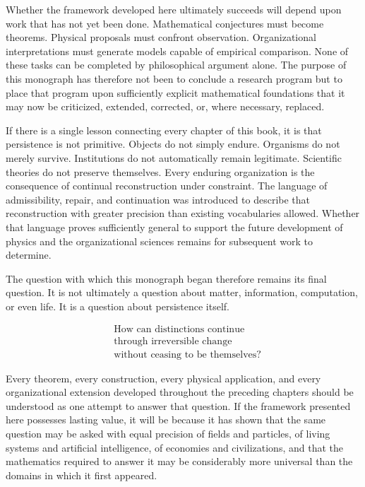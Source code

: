 \documentclass[11pt,oneside]{book}
\numberwithin{equation}{chapter}
\theoremstyle{definition}
\theoremstyle{plain}
\begin{document}
Whether the framework developed here ultimately succeeds will depend upon
work that has not yet been done. Mathematical conjectures must become
theorems. Physical proposals must confront observation. Organizational
interpretations must generate models capable of empirical comparison. None
of these tasks can be completed by philosophical argument alone. The
purpose of this monograph has therefore not been to conclude a research
program but to place that program upon sufficiently explicit mathematical
foundations that it may now be criticized, extended, corrected, or, where
necessary, replaced.

If there is a single lesson connecting every chapter of this book, it is
that persistence is not primitive. Objects do not simply endure. Organisms
do not merely survive. Institutions do not automatically remain
legitimate. Scientific theories do not preserve themselves. Every enduring
organization is the consequence of continual reconstruction under
constraint. The language of admissibility, repair, and continuation was
introduced to describe that reconstruction with greater precision than
existing vocabularies allowed. Whether that language proves sufficiently
general to support the future development of physics and the
organizational sciences remains for subsequent work to determine.

The question with which this monograph began therefore remains its final
question. It is not ultimately a question about matter, information,
computation, or even life. It is a question about persistence itself.

\[
\boxed{
\begin{aligned}
&\text{How can distinctions continue}\\
&\text{through irreversible change}\\
&\text{without ceasing to be themselves?}
\end{aligned}
}
\]

Every theorem, every construction, every physical application, and every
organizational extension developed throughout the preceding chapters
should be understood as one attempt to answer that question. If the
framework presented here possesses lasting value, it will be because it
has shown that the same question may be asked with equal precision of
fields and particles, of living systems and artificial intelligence, of
economies and civilizations, and that the mathematics required to answer
it may be considerably more universal than the domains in which it first
appeared.
\end{document}
